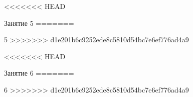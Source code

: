 \begin{class}[number=5]
	\begin{listofex}
<<<<<<< HEAD
		\item Занятие 5
=======
		\item 5
>>>>>>> d1e201b6c9252ede8c5810d54bc7e6ef776ad4a9
	\end{listofex}
\end{class}

\begin{class}[number=6]
	\begin{listofex}
<<<<<<< HEAD
		\item Занятие 6
=======
		\item 6
>>>>>>> d1e201b6c9252ede8c5810d54bc7e6ef776ad4a9
	\end{listofex}
\end{class}

